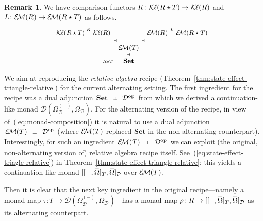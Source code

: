 \documentclass[9pt, preprint]{sigplanconf}
\theoremstyle{theorem}
\theoremstyle{definition}
\newtheorem{remark}[theorem]{Remark}
\newcommand{\cat}[1]{\mathcal{#1}}
\renewcommand{\bar}{\overbar}
\newcommand{\overbar}[1]{\mkern 1.5mu\overline{\mkern-1.5mu#1\mkern-1.5mu}\mkern 1.5mu}
\newcommand{\place}{{-}}
\newcommand{\op}{\mathrm{op}}
\newcommand{\Set}{\mathbf{Set}}
\newcommand{\Sets}{\Set}
\newcommand{\EM}{\mathcal{E}{\kern-.5ex}\mathcal{M}}
\newcommand{\Kl}{\mathcal{K}{\kern-.2ex}\ell}
\newcommand{\OmegaD}{\Omega_{\cat{D}}}
\begin{document}
\begin{remark}
  We have comparison functors
  $K \colon \Kl(R \star T) \to \Kl(R)$ and
  $L \colon \EM(R) \to \EM(R \star T)$ as follows.
  \begin{equation}\label{eq:two-player-comparison}
   \small
    \vcenter{
    \xymatrix@R-2em@C-2em{
      \Kl(R \star T) \ar[r]^-{K}
      & \Kl(R) \ar@/^/[rd]
      && \EM(R) \ar@/^/[ld] \ar[r]^-{L}
      & \EM(R \star T) \\
      && \EM(T) \ar@/^/[lu] \ar@/^/[ru] \ar@/^/[d] \ar@{}|{\dashv}[lu]
          \ar@{}|{\dashv}[ru]\\
      && \Set \ar@/^/[u] \ar@(lu, ld)_{R \star T} \ar@{}|{\dashv}[u]
    }}
  \end{equation}
\end{remark}

We aim at reproducing the \emph{relative algebra} recipe
(Theorem~\ref{thm:state-effect-triangle-relative}) for  the current
alternating setting. The first ingredient for the recipe was
a dual adjunction
\begin{math}
  \xymatrix@1@C-.5em{
    {\Sets}
      \ar@/^.4em/[r]
      \ar@{}[r]|-{\bot}
    &
    {\cat{D}^{\op}}
      \ar@/^.4em/[l]
  }
\end{math}
from which we derived a continuation-like monad
$\cat{D}(\OmegaD^{(\place)},\OmegaD)$. For the alternating version of the recipe,
in view of~(\ref{eq:monad-composition})
it is
natural to use
a dual adjunction
\begin{math}
  \xymatrix@1@C-.5em{
    {\EM(T)}
      \ar@/^.4em/[r]
      \ar@{}[r]|-{\bot}
    &
    {\cat{D}^{\op}}
      \ar@/^.4em/[l]
  }
\end{math}
(where $\EM(T)$ replaced $\Sets$ in the non-alternating counterpart).
Interestingly,
for such an ingredient
\begin{math}
  \xymatrix@1@C-.5em{
    {\EM(T)}
      \ar@/^.4em/[r]
      \ar@{}[r]|-{\bot}
    &
    {\cat{D}^{\op}}
      \ar@/^.4em/[l]
  }
\end{math}
we
can exploit   (the original, non-alternating version of) relative algebra
recipe itself. See~(\ref{eq:state-effect-triagle-relative}) in
Theorem~\ref{thm:state-effect-triangle-relative}; this yields a
continuation-like monad $[[\place , \bar{\Omega}]_{T} ,
\bar{\Omega}]_{\cat{D}}$ over $\EM(T)$.

Then it is clear that the next key ingredient in the original
recipe---namely a monad map
$\tau \colon T \to \cat{D}(\OmegaD^{(\place)}, \OmegaD)$---has
 a monad map
$\rho \colon R \to [[\place , \bar{\Omega}]_{T} ,
\bar{\Omega}]_{\cat{D}}$ as its alternating counterpart.
\end{document}
